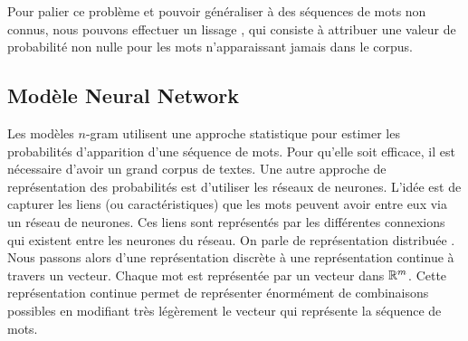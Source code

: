 Pour palier ce problème et pouvoir généraliser à des séquences de mots non connus, nous pouvons effectuer un \og lissage \fg{}, qui consiste à attribuer une valeur de probabilité non nulle pour les mots n'apparaissant jamais dans le corpus.

\subsection{Modèle Neural Network}

Les modèles $n$-gram utilisent une approche statistique pour estimer les probabilités d'apparition d'une séquence de mots. Pour qu'elle soit efficace, il est nécessaire d'avoir un grand corpus de textes.
Une autre approche de représentation des probabilités est d'utiliser les réseaux de neurones.
L'idée est de capturer les liens (ou caractéristiques) que les mots peuvent avoir entre eux via un réseau de neurones. Ces liens sont représentés par les différentes connexions qui existent entre les neurones du réseau.
On parle de \og représentation distribuée \fg{}.
Nous passons alors d'une représentation discrète à une représentation continue à travers un vecteur. 
Chaque mot est représentée par un vecteur dans $\mathbb{R}^m$. Cette représentation continue permet de représenter énormément de combinaisons possibles en modifiant très légèrement le vecteur qui représente la séquence de mots.



